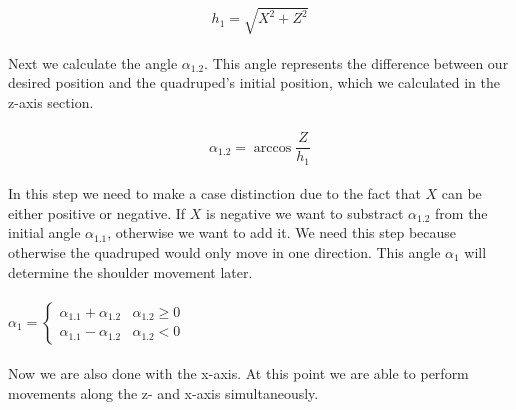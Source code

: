 \documentclass{article}
\begin{document}
    \paragraph{}
    \begin{equation}
        h_1 = \sqrt{X^2 + Z^2}
    \end{equation}

    \paragraph{}
    Next we calculate the angle $\alpha_{1.2}$. This angle represents the difference between our desired position and the quadruped's initial position, which we calculated in the z-axis section. 

    \paragraph{}
    \begin{equation}
        \alpha_{1.2} = \arccos \frac{Z}{h_1}
    \end{equation}

    \paragraph{}
    In this step we need to make a case distinction due to the fact that $X$ can be either positive or negative. If $X$ is negative we want to substract $\alpha_{1.2}$ from the initial angle $\alpha_{1.1}$, otherwise we want to add it. We need this step because otherwise the quadruped would only move in one direction. This angle $\alpha_1$ will determine the shoulder movement later.

    \paragraph{}
    \begin{center}
    $\alpha_1 = \left\{
    \begin{array}{ll}
    \alpha_{1.1} + \alpha_{1.2} & \alpha_{1.2} \ge 0 \\
    \alpha_{1.1} - \alpha_{1.2} & \alpha_{1.2} < 0
    \end{array}
    \right. $
    \end{center}

    \paragraph{}
    Now we are also done with the x-axis. At this point we are able to perform movements along the z- and x-axis simultaneously.
\end{document}
